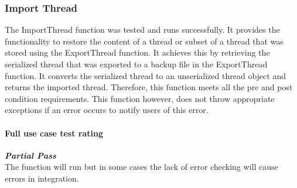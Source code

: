 \subsubsection{Import Thread}
The ImportThread function was tested and runs successfully. It provides the functionality to restore the content of a thread or subset of a thread that was stored using the ExportThread function. It achieves this by retrieving the serialized thread that was exported to a backup file in the ExportThread function. It converts the serialized thread to an unserialized  thread object and returns the imported thread. Therefore, this function meets all the pre and post condition requirements. This function however, does not throw appropriate exceptions if an error occurs to notify users of this error.
\paragraph{\color{black} Full use case test rating\\}
\color{myOrange}
\textbf{\small \emph{Partial Pass}} \\
\color{black} The function will run but in some cases the lack of error checking will cause errors in integration.
 
